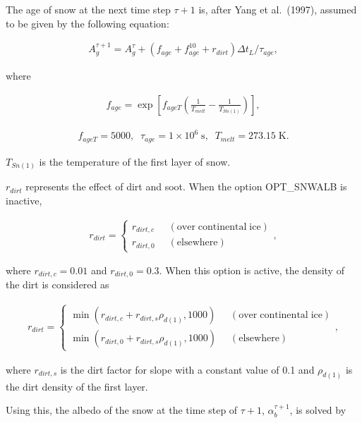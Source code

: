 The age of snow at the next time step \({\tau+1}\) is, after Yang et al.~(1997), assumed to be given by the following equation:

\begin{eqnarray}
A_g^{\tau+1} = A_g^{\tau} + (f_{age} + f_{age}^{10} + r_{dirt})\Delta t_L / \tau_{age}, \label{8-58}
\end{eqnarray}

where

\begin{eqnarray}
f_{age} = \exp{\left[ f_{ageT} \left( \frac{1}{T_{melt}} - \frac{1}{T_{Sn(1)}} \right) \right]}, \label{8-59}
\end{eqnarray}

\begin{eqnarray}
f_{ageT} = 5000, \;\; \tau_{age} = 1 \times 10^6 \;\mathrm{s}, \;\; T_{melt} = 273.15 \;\mathrm{K}.
\end{eqnarray}

\(T_{Sn(1)}\) is the temperature of the first layer of snow.

\(r_{dirt}\) represents the effect of dirt and soot. When the option OPT\_SNWALB is inactive,

\begin{eqnarray}
r_{dirt} = \left\{ \begin{aligned}
 r_{dirt,c} \;\;& \mathrm{(over \; continental \; ice)} \\
 r_{dirt,0} \;\;& \mathrm{(elsewhere)}
\end{aligned} \right., \label{8-60}
\end{eqnarray}

where \(r_{dirt,c} = 0.01\) and \(r_{dirt,0} = 0.3\). When this option is active, the density of the dirt is considered as

\begin{eqnarray}
r_{dirt} = \left\{ \begin{aligned}
 \min(r_{dirt,c} + r_{dirt,s}\rho_{d(1)}, 1000) \;\;& \mathrm{(over \; continental \; ice)} \\
 \min(r_{dirt,0} + r_{dirt,s}\rho_{d(1)}, 1000) \;\;& \mathrm{(elsewhere)}
\end{aligned} \right., \label{8-61}
\end{eqnarray}

where \(r_{dirt,s}\) is the dirt factor for slope with a constant value of 0.1 and \(\rho_{d(1)}\) is the dirt density of the first layer.

Using this, the albedo of the snow at the time step of \(\tau+1\), \(\alpha_b^{\tau+1}\), is solved by

